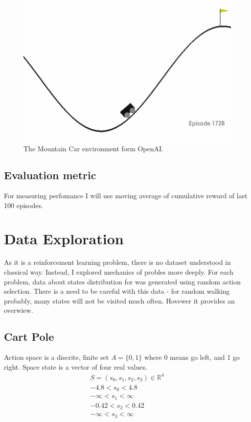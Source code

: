 \documentclass[12pt]{article}
\begin{document}
\begin{figure}[h]
\includegraphics[width=\textwidth]{mountaincar_intro.png} 
\centering
\caption{The Mountain Car environment form OpenAI.}
\end{figure}


\subsection{Evaluation metric}

For measuring perfomance I will use moving average of cumulative reward of last 100 episodes.

\section{Data Exploration}

As it is a reinforcement learning problem, there is no dataset understood in classical way. Instead, I explored mechanics of probles more deeply. For each problem, data about states distribution for was generated using random action selection. There is a need to be careful with this data - for random walking probably, many states will not be visited much often. Hovewer it provides an overwiew.

\subsection{Cart Pole}

Action space is a discrite, finite set $A = \{0,1\}$ where 0 means go left, and 1 go right.
Space state is a vector of four real values. 
\begin{multline}
 S = (s_0, s_1, s_2, s_3) \in \mathbb{R}^4 \\
-4.8 < s_0 < 4.8 \\
-\infty < s_1 < \infty \\
-0.42 < s_2 < 0.42 \\
-\infty < s_3 < \infty \\
\end{multline}
\end{document}
